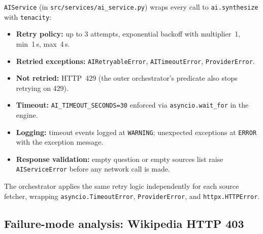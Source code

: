 \documentclass[11pt,a4paper]{article}
\begin{document}
\texttt{AIService} (in \texttt{src/services/ai\_service.py}) wraps every call to \texttt{ai.synthesize} with \texttt{tenacity}:
\begin{itemize}[noitemsep]
  \item \textbf{Retry policy:} up to 3 attempts, exponential backoff with multiplier~1, min~1\,s, max~4\,s.
  \item \textbf{Retried exceptions:} \texttt{AIRetryableError}, \texttt{AITimeoutError}, \texttt{ProviderError}.
  \item \textbf{Not retried:} HTTP~429 (the outer orchestrator's predicate also stops retrying on 429).
  \item \textbf{Timeout:} \texttt{AI\_TIMEOUT\_SECONDS=30} enforced via \texttt{asyncio.wait\_for} in the engine.
  \item \textbf{Logging:} timeout events logged at \texttt{WARNING}; unexpected exceptions at \texttt{ERROR} with the exception message.
  \item \textbf{Response validation:} empty question or empty sources list raise \texttt{AIServiceError} before any network call is made.
\end{itemize}

The orchestrator applies the same retry logic independently for each source fetcher, wrapping \texttt{asyncio.TimeoutError}, \texttt{ProviderError}, and \texttt{httpx.HTTPError}.

\subsection{Failure-mode analysis: Wikipedia HTTP 403}
\end{document}

